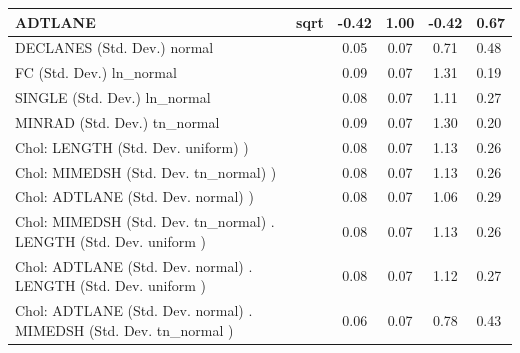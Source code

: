 \begin{table}
\begin{center}
\begin{tabular}{|l|l|c|c|c|l|}
			\hline
			ADTLANE & sqrt & -0.42 & 1.00 & -0.42 & 0.67 \\
			\hline
			DECLANES (Std. Dev.) normal &  & 0.05 & 0.07 & 0.71 & 0.48 \\
			\hline
			FC (Std. Dev.) ln_normal &  & 0.09 & 0.07 & 1.31 & 0.19 \\
			\hline
			SINGLE (Std. Dev.) ln_normal &  & 0.08 & 0.07 & 1.11 & 0.27 \\
			\hline
			MINRAD (Std. Dev.) tn_normal &  & 0.09 & 0.07 & 1.30 & 0.20 \\
			\hline
			 Chol: LENGTH (Std. Dev. uniform) ) &  & 0.08 & 0.07 & 1.13 & 0.26 \\
			\hline
			 Chol: MIMEDSH (Std. Dev. tn_normal) ) &  & 0.08 & 0.07 & 1.13 & 0.26 \\
			\hline
			 Chol: ADTLANE (Std. Dev. normal) ) &  & 0.08 & 0.07 & 1.06 & 0.29 \\
			\hline
			 Chol: MIMEDSH (Std. Dev. tn_normal) . LENGTH (Std. Dev.   uniform ) &  & 0.08 & 0.07 & 1.13 & 0.26 \\
			\hline
			 Chol: ADTLANE (Std. Dev. normal) . LENGTH (Std. Dev.   uniform ) &  & 0.08 & 0.07 & 1.12 & 0.27 \\
			\hline
			 Chol: ADTLANE (Std. Dev. normal) . MIMEDSH (Std. Dev.   tn_normal ) &  & 0.06 & 0.07 & 0.78 & 0.43 \\
			\hline
		\end{tabular}
	\end{center}
\end{table}